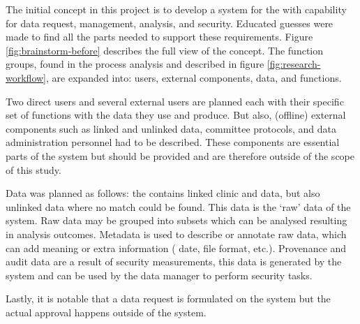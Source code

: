 The initial concept in this project is to develop a system for the \projectdata{} with capability for data request, management, analysis, and security.
Educated guesses were made to find all the parts needed to support these requirements.
Figure \ref{fig:brainstorm-before} describes the full view of the concept. 
The function groups, found in the process analysis and described in figure \ref{fig:research-workflow}, are expanded into: users, external components, data, and functions.

Two direct users and several external users are planned each with their specific set of functions with the data they use and produce.
But also, (offline) external components such as linked and unlinked data, committee protocols, and data administration personnel had to be described.
These components are essential parts of the system but should be provided and are therefore outside of the scope of this study.

Data was planned as follows: the \projectdata{} contains linked clinic and \PRN{} data, but also unlinked data where no match could be found.
This data is the `raw' data of the system.
Raw data may be grouped into subsets which can be analysed resulting in analysis outcomes.
Metadata is used to describe or annotate raw data, which can add meaning or extra information (\eg{} date, file format, etc.).
Provenance and audit data are a result of security measurements, this data is generated by the system and can be used by the data manager to perform security tasks.

Lastly, it is notable that a data request is formulated on the system but the actual approval happens outside of the system.